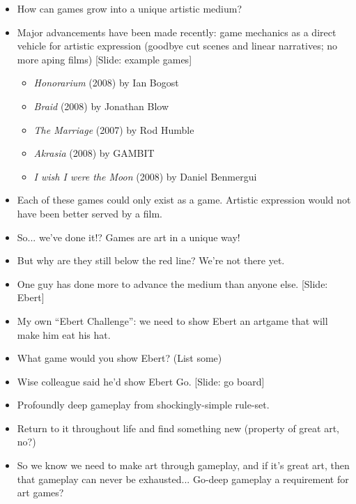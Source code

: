 \documentclass[12pt]{article}
\begin{document}
{\begin{itemize}
\item How can games grow into a unique artistic medium?

\newpage

\item Major advancements have been made recently:  game mechanics as a direct vehicle for artistic expression (goodbye cut scenes and linear narratives; no more aping films) [Slide: example games] {\large \begin{itemize}
\item {\it Honorarium} (2008) by Ian Bogost
\item {\it Braid} (2008) by Jonathan Blow
\item {\it The Marriage} (2007) by Rod Humble
\item {\it Akrasia} (2008) by GAMBIT
\item {\it I wish I were the Moon} (2008) by Daniel Benmergui
\end{itemize} }

\item Each of these games could only exist as a game.  Artistic expression would not have been better served by a film.

\item So... we've done it!?  Games are art in a unique way!

\item But why are they still below the red line?  We're not there yet.

\item One guy has done more to advance the medium than anyone else. [Slide: Ebert]

\item My own ``Ebert Challenge'':  we need to show Ebert an artgame that will make him eat his hat.

\item What game would you show Ebert?  (List some)

\item Wise colleague said he'd show Ebert Go.  [Slide:  go board]

\item Profoundly deep gameplay from shockingly-simple rule-set.

\item Return to it throughout life and find something new (property of great art, no?)

\item So we know we need to make art through gameplay, and if it's great art, then that gameplay can never be exhausted...  Go-deep gameplay a requirement for art games?


\end{itemize}}
\end{document}
